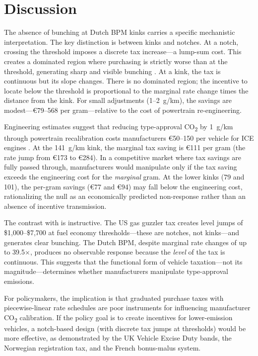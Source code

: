 \documentclass[12pt]{article}
\begin{document}
\section{Discussion}

The absence of bunching at Dutch BPM kinks carries a specific mechanistic interpretation. The key distinction is between kinks and notches. At a notch, crossing the threshold imposes a discrete tax increase---a lump-sum cost. This creates a dominated region where purchasing is strictly worse than at the threshold, generating sharp and visible bunching \citep{kleven2013}. At a kink, the tax is continuous but its slope changes. There is no dominated region; the incentive to locate below the threshold is proportional to the marginal rate change times the distance from the kink. For small adjustments (1--2~g/km), the savings are modest---\euro 79--568 per gram---relative to the cost of powertrain re-engineering.

Engineering estimates suggest that reducing type-approval CO\textsubscript{2} by 1~g/km through powertrain recalibration costs manufacturers \euro 50--150 per vehicle for ICE engines \citep{reynaert2021}. At the 141~g/km kink, the marginal tax saving is \euro 111 per gram (the rate jump from \euro 173 to \euro 284). In a competitive market where tax savings are fully passed through, manufacturers would manipulate only if the tax saving exceeds the engineering cost for the \textit{marginal} gram. At the lower kinks (79 and 101), the per-gram savings (\euro 77 and \euro 94) may fall below the engineering cost, rationalizing the null as an economically predicted non-response rather than an absence of incentive transmission.

The contrast with \citet{sallee2012} is instructive. The US gas guzzler tax creates level jumps of \$1,000--\$7,700 at fuel economy thresholds---these are notches, not kinks---and generates clear bunching. The Dutch BPM, despite marginal rate changes of up to 39.5$\times$, produces no observable response because the \textit{level} of the tax is continuous. This suggests that the functional form of vehicle taxation---not its magnitude---determines whether manufacturers manipulate type-approval emissions.

For policymakers, the implication is that graduated purchase taxes with piecewise-linear rate schedules are poor instruments for influencing manufacturer CO\textsubscript{2} calibration. If the policy goal is to create incentives for lower-emission vehicles, a notch-based design (with discrete tax jumps at thresholds) would be more effective, as demonstrated by the UK Vehicle Excise Duty bands, the Norwegian registration tax, and the French bonus-malus system.
\end{document}
